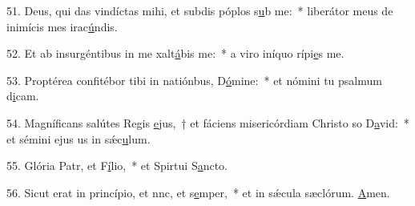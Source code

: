51. Deus, qui das vindíctas mihi, et subdis póplos s\uline{u}b me:~* liberátor meus de inimícis mes irac\uline{ú}ndis.\par 
52. Et ab insurgéntibus in me xalt\uline{á}bis me:~* a viro iníquo rípi\uline{e}s me.\par 
53. Proptérea confitébor tibi in natiónbus, D\uline{ó}mine:~* et nómini tu psalmum d\uline{i}cam.\par 
54. Magníficans salútes Regis \uline{e}jus,~† et fáciens misericórdiam Christo so D\uline{a}vid:~* et sémini ejus us in sǽc\uline{u}lum.\par 
55. Glória Patr, et F\uline{í}lio,~* et Spirtui S\uline{a}ncto.\par 
56. Sicut erat in princípio, et nnc, et s\uline{e}mper,~* et in sǽcula sæclórum. \uline{A}men.\par 
